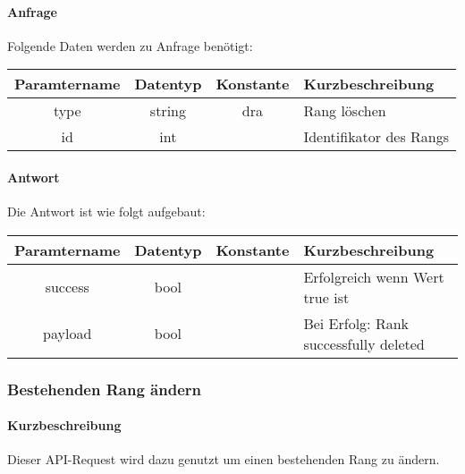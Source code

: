\paragraph{Anfrage}Folgende Daten werden zu Anfrage benötigt:
\begin{table}[H]
	\begin{tabular}{|c|c|c|p{6.5cm}|}
		\hline
		\textbf{Paramtername} & \textbf{Datentyp} & \textbf{Konstante} & \textbf{Kurzbeschreibung}                                                                                               \\ \hline
		type                & string            & dra                & Rang löschen \\ \hline
		id                  & int               &                    & Identifikator des Rangs \\ \hline
	\end{tabular}
\end{table}
\paragraph{Antwort}Die Antwort ist wie folgt aufgebaut:
\begin{table}[H]
	\begin{tabular}{|c|c|c|p{6.5cm}|}
		\hline
		\textbf{Paramtername} & \textbf{Datentyp} & \textbf{Konstante} & \textbf{Kurzbeschreibung}            \\ \hline                
		success             & bool             &                 & Erfolgreich wenn Wert {\glqq true\grqq} ist \\ \hline
		payload             & bool             &                 & Bei Erfolg: {\glqq Rank successfully deleted\grqq} \\ \hline
	\end{tabular}
\end{table}
\subsubsection{Bestehenden Rang ändern}
\paragraph{Kurzbeschreibung}Dieser API-Request wird dazu genutzt um einen bestehenden Rang zu ändern.
